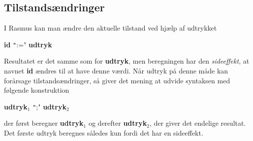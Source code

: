 \documentclass{article}
\newcounter{eks}
\begin{document}
\subsection{Tilstands\ae{}ndringer}
I {\sc Rasmus} kan man \ae{}ndre den aktuelle tilstand ved hj\ae{}lp af 
udtrykket
\begin{center}
{\bf id} \texttt":=" {\bf udtryk}
\end{center}
Resultatet er det samme som for {\bf udtryk}, men beregningen har
den {\em sideeffekt}, at navnet {\bf id} \ae{}ndres til at have denne
v\ae{}rdi. N\aa{}r udtryk p\aa{} denne m\aa{}de kan for\aa{}rsage tilstands\ae{}ndringer, s\aa{}
giver det mening at udvide syntaksen med f\o{}lgende konstruktion
\begin{center}
{\bf udtryk$_1$} \texttt";" {\bf udtryk$_2$}
\end{center}
der f\o{}rst beregner {\bf udtryk$_1$} og derefter {\bf udtryk$_2$},
der giver det endelige resultat. Det f\o{}rste udtryk beregnes s\aa{}ledes
kun fordi det har en sideeffekt.

        

\end{document}

